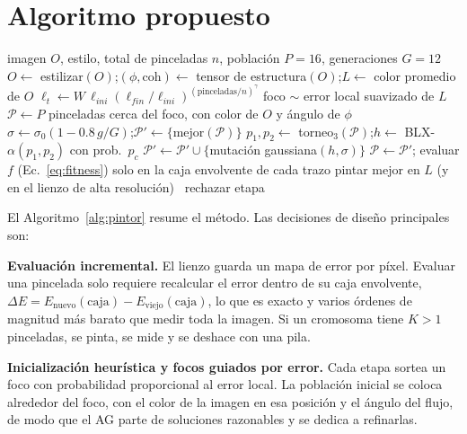 \documentclass[10pt,letterpaper]{article}
\begin{document}
\section{Algoritmo propuesto}
\begin{algorithm}[t]
\caption{Pintor evolutivo (AG por etapas, de lo grueso a lo fino)}
\label{alg:pintor}
\small
\begin{algorithmic}[1]
\Require imagen $O$, estilo, total de pinceladas $n$, población $P{=}16$, generaciones $G{=}12$
\State $O \gets$ estilizar$(O)$;\quad $(\phi,\text{coh})\gets$ tensor de estructura$(O)$;\quad $L\gets$ color promedio de $O$
  \State $\ell_t \gets W\,\ell_{ini}(\ell_{fin}/\ell_{ini})^{(\text{pinceladas}/n)^{\gamma}}$ 
  \State foco $\sim$ error local suavizado de $L$ 
  \State $\mathcal{P}\gets P$ pinceladas cerca del foco, con color de $O$ y ángulo de $\phi$ 
    \State $\sigma\gets\sigma_0(1-0.8\,g/G)$;\quad $\mathcal{P}'\gets\{\text{mejor}(\mathcal{P})\}$ 
       \State $p_1,p_2\gets$ torneo$_3(\mathcal{P})$;\quad $h\gets$ BLX-$\alpha(p_1,p_2)$ con prob.\ $p_c$
       \State $\mathcal{P}'\gets\mathcal{P}'\cup\{$mutación gaussiana$(h,\sigma)\}$
    \EndWhile
    \State $\mathcal{P}\gets\mathcal{P}'$; evaluar $f$ (Ec.~\ref{eq:fitness}) solo en la caja envolvente de cada trazo
  \EndFor
   pintar mejor en $L$ (y en el lienzo de alta resolución) \Else\ rechazar etapa \EndIf
\EndWhile
\end{algorithmic}
\end{algorithm}

El Algoritmo~\ref{alg:pintor} resume el método. Las decisiones de diseño principales son:

\textbf{Evaluación incremental.} El lienzo guarda un mapa de error por píxel. Evaluar una pincelada solo requiere recalcular el error dentro de su caja envolvente, $\Delta E = E_{\text{nuevo}}(\text{caja})-E_{\text{viejo}}(\text{caja})$, lo que es exacto y varios órdenes de magnitud más barato que medir toda la imagen. Si un cromosoma tiene $K>1$ pinceladas, se pinta, se mide y se deshace con una pila.

\textbf{Inicialización heurística y focos guiados por error.} Cada etapa sortea un foco con probabilidad proporcional al error local. La población inicial se coloca alrededor del foco, con el color de la imagen en esa posición y el ángulo del flujo, de modo que el AG parte de soluciones razonables y se dedica a refinarlas.
\end{document}
